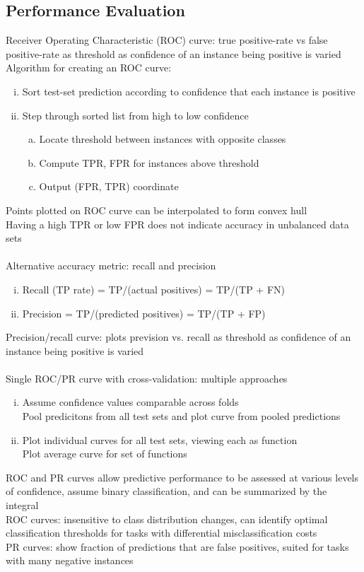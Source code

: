 \documentclass{article}
\begin{document}
		\subsection{Performance Evaluation}
			Receiver Operating Characteristic (ROC) curve: true positive-rate vs false positive-rate as threshold as confidence of an instance being positive is varied \\
			Algorithm for creating an ROC curve: 
			\begin{enumerate}[(i)]
				\item Sort test-set prediction according to confidence that each instance is positive
				\item Step through sorted list from high to low confidence
				\begin{enumerate}[(a)]
					\item Locate threshold between instances with opposite classes
					\item Compute TPR, FPR for instances above threshold
					\item Output (FPR, TPR) coordinate
					\end{enumerate}
				\end{enumerate}
			Points plotted on ROC curve can be interpolated to form convex hull \\
			Having a high TPR or low FPR does not indicate accuracy in unbalanced data sets \\
			\\
			Alternative accuracy metric: recall and precision
			\begin{enumerate}[(i)]
			 	\item Recall (TP rate) = TP/(actual positives) = TP/(TP + FN)
			 	\item Precision = TP/(predicted positives) = TP/(TP + FP)
				\end{enumerate}
			Precision/recall curve: plots prevision vs. recall as threshold as confidence of an instance being positive is varied \\
			\\
			Single ROC/PR curve with cross-validation: multiple approaches
			\begin{enumerate}[(i)]
				\item Assume confidence values comparable across folds \\
				Pool predicitons from all test sets and plot curve from pooled predictions
				\item Plot individual curves for all test sets, viewing each as function \\
				Plot average curve for set of functions 
				\end{enumerate}
			ROC and PR curves allow predictive performance to be assessed at various levels of confidence, assume binary classification, and can be summarized by the integral \\
			ROC curves: insensitive to class distribution changes, can identify optimal classification thresholds for tasks with differential misclassification costs \\
			PR curves: show fraction of predictions that are false positives, suited for tasks with many negative instances
\end{document}
